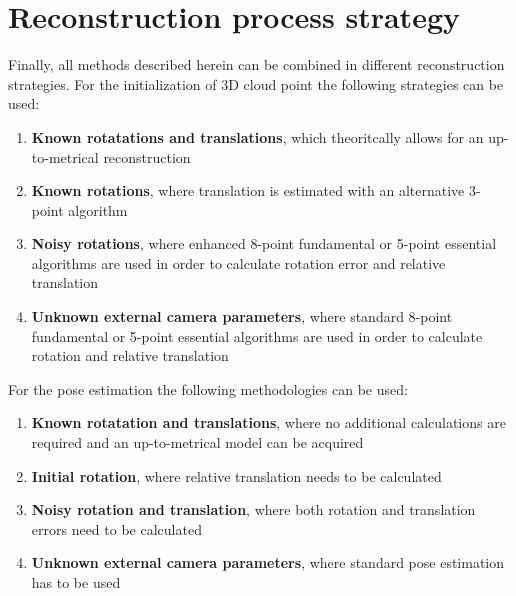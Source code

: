 \section{Reconstruction process strategy}
Finally, all methods described herein can be combined in different reconstruction strategies. For the initialization of 3D cloud point the following strategies can be used: 
\begin{enumerate} 
\item \textbf{Known rotatations and translations}, which theoritcally allows for an up-to-metrical reconstruction
\item \textbf{Known rotations}, where translation is estimated with an alternative 3-point algorithm
\item \textbf{Noisy rotations}, where enhanced 8-point fundamental or 5-point essential algorithms are used in order to calculate rotation error and relative translation 
\item \textbf{Unknown external camera parameters}, where standard 8-point fundamental or 5-point essential algorithms are used in order to calculate rotation and relative translation
\end{enumerate}
For the pose estimation the following methodologies can be used:
\begin{enumerate}
\item \textbf{Known rotatation and translations}, where no additional calculations are required and an up-to-metrical model can be acquired
\item \textbf{Initial rotation}, where relative translation needs to be calculated
\item \textbf{Noisy rotation and translation}, where both rotation and translation errors need to be calculated
\item \textbf{Unknown external camera parameters}, where standard pose estimation has to be used
\end{enumerate}


